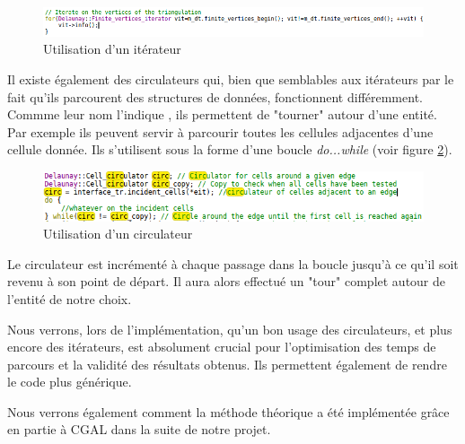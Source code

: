 \begin{figure}[ht]
\centering
  \includegraphics[width=\textwidth]{figures/access_it.png}
  \caption{Utilisation d'un itérateur}
  \label{fig::access_it}
\end{figure}


Il existe également des circulateurs qui, bien que semblables aux itérateurs par le fait
qu'ils parcourent des structures de données, fonctionnent différemment. Commme leur nom
l'indique , ils permettent de "tourner" autour d'une entité. Par exemple ils peuvent
servir à parcourir toutes les cellules adjacentes d'une cellule donnée. Ils s'utilisent
sous la forme d'une boucle \textit{do...while} (voir figure \ref{fig::circ_ex}).
\begin{figure}[ht]
\centering
  \includegraphics[width=\textwidth]{figures/circ_ex.png}
  \caption{Utilisation d'un circulateur}
  \label{fig::circ_ex}
\end{figure}
 Le circulateur est incrémenté à chaque
passage dans la boucle jusqu'à ce qu'il soit revenu à son point de départ. Il aura alors
effectué un "tour" complet autour de l'entité de notre choix.


Nous verrons, lors de l'implémentation, qu'un bon usage des circulateurs, et plus encore des itérateurs,
est absolument crucial pour l'optimisation des temps de parcours et la validité
des résultats obtenus. Ils permettent également de rendre le code plus générique.

Nous verrons également comment la méthode théorique a été implémentée grâce en partie à CGAL
dans la suite de notre projet.
